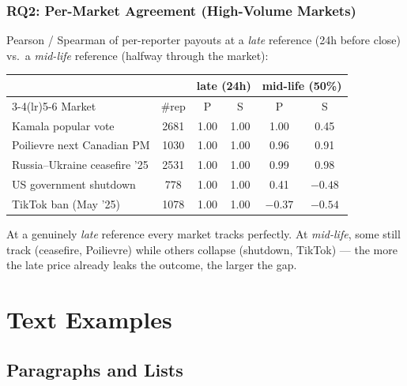 \documentclass[
	11pt, %
]{beamer}
\begin{document}
\begin{frame}
	\frametitle{RQ2: Per-Market Agreement (High-Volume Markets)}

	Pearson / Spearman of per-reporter payouts at a \emph{late} reference (24h before close) vs.\ a \emph{mid-life} reference (halfway through the market):

	\medskip
	\begin{table}
		\centering
		\footnotesize
		\setlength{\tabcolsep}{6pt}
		\begin{tabular}{lccccc}
			\toprule
			& & \multicolumn{2}{c}{late (24h)} & \multicolumn{2}{c}{mid-life (50\%)} \\
			\cmidrule(lr){3-4}\cmidrule(lr){5-6}
			Market & \#rep & P & S & P & S \\
			\midrule
			Kamala popular vote        & 2681 & 1.00 & 1.00 & 1.00 & 0.45 \\
			Poilievre next Canadian PM & 1030 & 1.00 & 1.00 & 0.96 & 0.91 \\
			Russia--Ukraine ceasefire '25 & 2531 & 1.00 & 1.00 & 0.99 & 0.98 \\
			US government shutdown     &  778 & 1.00 & 1.00 & 0.41 & $-0.48$ \\
			TikTok ban (May '25)       & 1078 & 1.00 & 1.00 & $-0.37$ & $-0.54$ \\
			\bottomrule
		\end{tabular}
	\end{table}

	\medskip
	{\footnotesize At a genuinely \emph{late} reference every market tracks perfectly. At \emph{mid-life}, some still track (ceasefire, Poilievre) while others collapse (shutdown, TikTok) --- the more the late price already leaks the outcome, the larger the gap.}
\end{frame}



\section{Text Examples} %

\subsection{Paragraphs and Lists}
\end{document}
